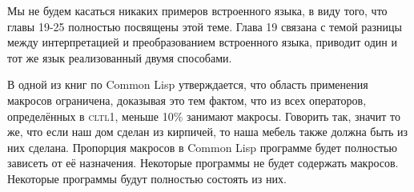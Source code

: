 \documentclass[12pt, a4paper]{article} %
\begin{document}
Мы не будем касаться никаких примеров встроенного языка, в виду того, что главы 19-25 полностью посвящены этой теме. Глава 19 связана с темой разницы между интерпретацией и преобразованием встроенного языка, приводит один и тот же язык реализованный двумя способами.

В одной из книг по Common Lisp утверждается, что область применения макросов ограничена, доказывая это тем фактом, что из всех операторов, определённых в \textsc{cltl1}, меньше 10\% занимают макросы. Говорить так, значит то же, что если наш дом сделан из кирпичей, то наша мебель также должна быть из них сделана.  Пропорция макросов в Common Lisp программе будет полностью зависеть от её назначения. Некоторые программы не будет содержать макросов. Некоторые программы будут полностью состоять из них.
\end{document}

